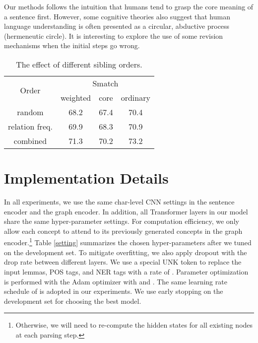 \documentclass[11pt,a4paper]{article}
\begin{document}
	Our methods follows the intuition that humans tend to grasp the core meaning of a sentence first. However, some cognitive theories \cite{langacker2008cognitive} also suggest that human language understanding is often presented as a circular, abductive process (hermeneutic circle). It is interesting to explore the use of some revision mechanisms when the initial steps go wrong.
	\begin{table}[t]
		\centering
		\begin{tabular}{c|c|c|c}
			\hline
			\multirow{2}{*}{Order} & \multicolumn{3}{c}{Smatch}\\
			\cline{2-4}
			& weighted & core & ordinary \\
			\hline
			random & 68.2 & 67.4& 70.4\\
			relation freq.& 69.9& 68.3&70.9 \\
			combined &71.3&70.2&73.2 \\
			\hline
		\end{tabular}
		\caption{The effect of different sibling orders. }
		\label{variants}
	\end{table}
	
	
\appendix
\newpage
\section{Implementation Details}
In all experiments, we use the same char-level CNN settings in the sentence encoder and the graph encoder. In addition, all Transformer \cite{vaswani2017attention} layers in our model share the same hyper-parameter settings. For computation efficiency, we only allow each concept to attend to its previously generated concepts in the graph encoder.\footnote{Otherwise, we will need to re-compute the hidden states for all existing nodes at each parsing step.} Table \ref{setting} summarizes the chosen hyper-parameters after we tuned on the development set. To mitigate overfitting, we also apply dropout \cite{srivastava2014dropout} with the drop rate  between different layers. We use a special UNK token to replace the input lemmas, POS tags, and NER tags with a rate of . Parameter optimization is performed with the Adam optimizer \cite{kingma2014adam} with  and . The same learning rate schedule of \cite{vaswani2017attention} is adopted in our experiments. We use early stopping on the development set for choosing the best model.
\end{document}
